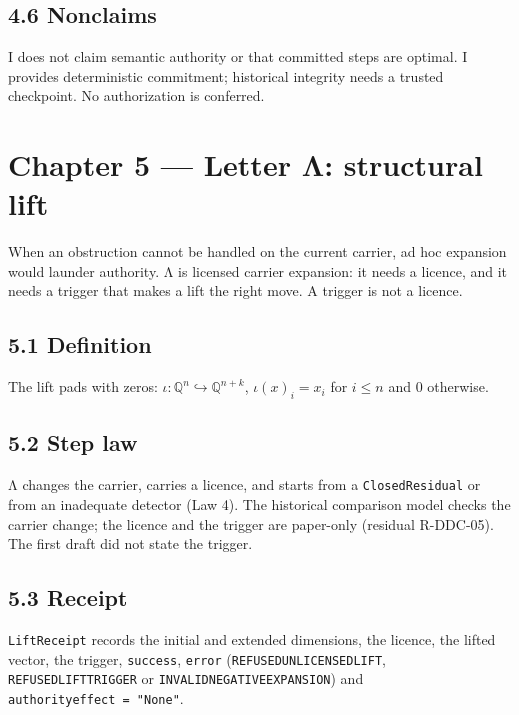 \documentclass[
  11pt,
]{article}
\newenvironment{Shaded}{}{}
\newcommand{\NormalTok}[1]{#1}
\renewcommand{\_}{\ddcunderscore\allowbreak}
\begin{document}
\subsection{4.6 Nonclaims}\label{nonclaims-3}

\begin{Shaded}
\begin{Highlighting}[]
\NormalTok{I does not claim semantic authority or that committed steps are optimal.}
\NormalTok{I provides deterministic commitment; historical integrity needs a trusted checkpoint.}
\NormalTok{No authorization is conferred.}
\end{Highlighting}
\end{Shaded}

\section{Chapter 5 --- Letter Λ: structural lift}\label{chapter-5}

When an obstruction cannot be handled on the current carrier, ad hoc
expansion would launder authority. Λ is licensed carrier expansion: it
needs a licence, and it needs a trigger that makes a lift the right
move. A trigger is not a licence.

\subsection{5.1 Definition}\label{definition-5}

The lift pads with zeros: \(\iota : \mathbb{Q}^n \hookrightarrow
\mathbb{Q}^{n+k}\), \(\iota(x)_i = x_i\) for \(i \le n\) and \(0\)
otherwise.

\subsection{5.2 Step law}\label{step-law-4}

Λ changes the carrier, carries a licence, and starts from a
\texttt{Closed\allowbreak Residual} or from an inadequate detector (Law 4). The
historical comparison model checks the carrier change; the licence and
the trigger are paper-only (residual R-DDC-05). The first draft did not
state the trigger.

\subsection{5.3 Receipt}\label{receipt-4}

\texttt{Lift\allowbreak Receipt} records the initial and extended dimensions, the
licence, the lifted vector, the trigger, \texttt{success},
\texttt{error} (\texttt{REFUSED\_UNLICENSED\_LIFT},
\texttt{REFUSED\_LIFT\_TRIGGER} or
\texttt{INVALID\_NEGATIVE\_EXPANSION}) and
\texttt{authority\_effect\ =\ "None"}.
\end{document}
